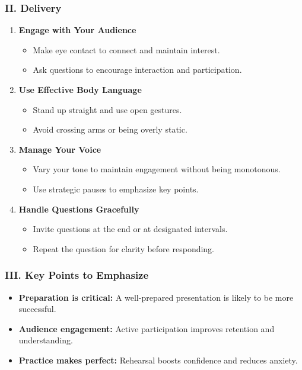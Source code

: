 \documentclass[aspectratio=169]{beamer}
\begin{document}
\begin{frame}[fragile]
    \frametitle{II. Delivery}
    \begin{enumerate}
        \item \textbf{Engage with Your Audience}
        \begin{itemize}
            \item Make eye contact to connect and maintain interest.
            \item Ask questions to encourage interaction and participation.
        \end{itemize}

        \item \textbf{Use Effective Body Language}
        \begin{itemize}
            \item Stand up straight and use open gestures.
            \item Avoid crossing arms or being overly static.
        \end{itemize}

        \item \textbf{Manage Your Voice}
        \begin{itemize}
            \item Vary your tone to maintain engagement without being monotonous.
            \item Use strategic pauses to emphasize key points.
        \end{itemize}

        \item \textbf{Handle Questions Gracefully}
        \begin{itemize}
            \item Invite questions at the end or at designated intervals.
            \item Repeat the question for clarity before responding.
        \end{itemize}
    \end{enumerate}
\end{frame}

\begin{frame}[fragile]
    \frametitle{III. Key Points to Emphasize}
    \begin{itemize}
        \item \textbf{Preparation is critical:} A well-prepared presentation is likely to be more successful.
        \item \textbf{Audience engagement:} Active participation improves retention and understanding.
        \item \textbf{Practice makes perfect:} Rehearsal boosts confidence and reduces anxiety.
    \end{itemize}
\end{frame}
\end{document}
